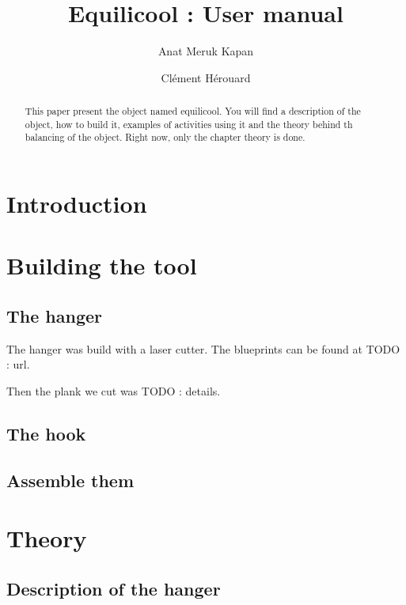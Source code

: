 \documentclass{report}
\title{Equilicool : User manual}
\author{Anat Meruk Kapan \and Clément Hérouard}
\begin{document}
\maketitle

\begin{abstract}
This paper present the object named equilicool.
You will find a description of the object, how to build it, examples of activities using it and the theory behind th balancing of the object.
{\color{red} Right now, only the chapter theory is done.}
\end{abstract}

\tableofcontents

\chapter{Introduction}

\chapter{Building the tool}

\section{The hanger}

The hanger was build with a laser cutter.
The blueprints can be found at {\color{red}TODO : url}.

Then the plank we cut was {\color{red}TODO : details}.

\section{The hook}

\section{Assemble them}

\chapter{Theory}

\section{Description of the hanger}
\end{document}

